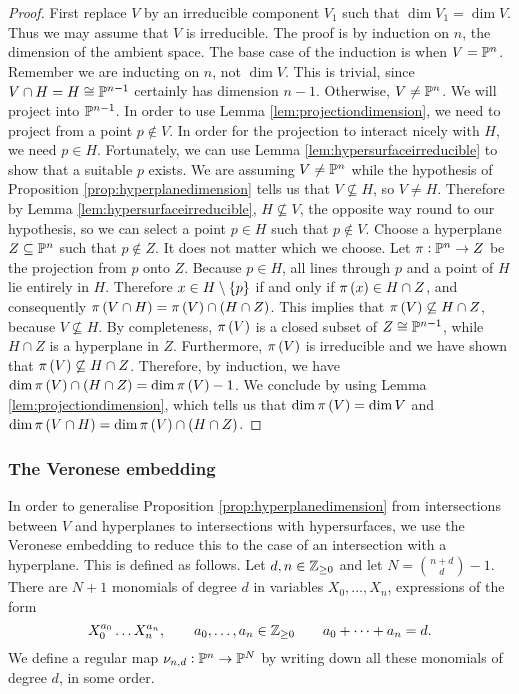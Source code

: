 \begin{proof}
First replace $ V $ by an irreducible component $ V_1 $ such that $ \dim V_1 = \dim V $. Thus we may assume that $ V $ is irreducible. The proof is by induction on $ n $, the dimension of the ambient space. The base case of the induction is when $ V = \mathbb{P}^n $. Remember we are inducting on $ n $, not $ \dim V $. This is trivial, since $ V \cap H = H \cong \mathbb{P}^{n - 1} $ certainly has dimension $ n - 1 $. Otherwise, $ V \ne \mathbb{P}^n $. We will project into $ \mathbb{P}^{n - 1} $. In order to use Lemma \ref{lem:projectiondimension}, we need to project from a point $ p \notin V $. In order for the projection to interact nicely with $ H $, we need $ p \in H $. Fortunately, we can use Lemma \ref{lem:hypersurfaceirreducible} to show that a suitable $ p $ exists. We are assuming $ V \ne \mathbb{P}^n $ while the hypothesis of Proposition \ref{prop:hyperplanedimension} tells us that $ V \not\subseteq H $, so $ V \ne H $. Therefore by Lemma \ref{lem:hypersurfaceirreducible}, $ H \not\subseteq V $, the opposite way round to our hypothesis, so we can select a point $ p \in H $ such that $ p \notin V $. Choose a hyperplane $ Z \subseteq \mathbb{P}^n $ such that $ p \notin Z $. It does not matter which we choose. Let $ \pi : \mathbb{P}^n \to Z $ be the projection from $ p $ onto $ Z $. Because $ p \in H $, all lines through $ p $ and a point of $ H $ lie entirely in $ H $. Therefore $ x \in H \setminus \cbr{p} $ if and only if $ \pi\br{x} \in H \cap Z $, and consequently $ \pi\br{V \cap H} = \pi\br{V} \cap \br{H \cap Z} $. This implies that $ \pi\br{V} \not\subseteq H \cap Z $, because $ V \not\subseteq H $. By completeness, $ \pi\br{V} $ is a closed subset of $ Z \cong \mathbb{P}^{n - 1} $, while $ H \cap Z $ is a hyperplane in $ Z $. Furthermore, $ \pi\br{V} $ is irreducible and we have shown that $ \pi\br{V} \not\subseteq H \cap Z $. Therefore, by induction, we have $ \dim \pi\br{V} \cap \br{H \cap Z} = \dim \pi\br{V} - 1 $. We conclude by using Lemma \ref{lem:projectiondimension}, which tells us that $ \dim \pi\br{V} = \dim V $ and $ \dim \pi\br{V \cap H} = \dim \pi\br{V} \cap \br{H \cap Z} $.
\end{proof}

\pagebreak

\subsubsection{The Veronese embedding}


In order to generalise Proposition \ref{prop:hyperplanedimension} from intersections between $ V $ and hyperplanes to intersections with hypersurfaces, we use the Veronese embedding to reduce this to the case of an intersection with a hyperplane. This is defined as follows. Let $ d, n \in \mathbb{Z}_{\ge 0} $ and let $ N = \binom{n + d}{d} - 1 $. There are $ N + 1 $ monomials of degree $ d $ in variables $ X_0, \dots, X_n $, expressions of the form
$$ X_0^{a_0} \dots X_n^{a_n}, \qquad a_0, \dots, a_n \in \mathbb{Z}_{\ge 0} \qquad a_0 + \dots + a_n = d. $$
We define a regular map $ \nu_{n, d} : \mathbb{P}^n \to \mathbb{P}^N $ by writing down all these monomials of degree $ d $, in some order.

